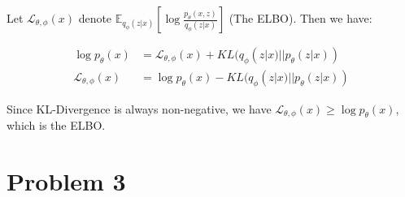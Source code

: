 \documentclass{article}
\begin{document}
\color{blue}

Let $\mathcal{L}_{\theta, \phi}(x)$ denote $\mathbb{E}_{q_\phi(z|x)}\left[\log\frac{p_\theta(x,z)}{q_\phi(z|x)}\right]$ (The ELBO). Then we have:

\begin{align}
    \log p_\theta(x) &= \mathcal{L}_{\theta, \phi}(x) + KL(q_\phi(z|x)||p_\theta(z|x))\\
    \mathcal{L}_{\theta, \phi}(x) &= \log p_\theta(x) - KL(q_\phi(z|x)||p_\theta(z|x))
\end{align}

Since KL-Divergence is always non-negative, we have $\mathcal{L}_{\theta, \phi}(x) \geq \log p_\theta(x)$, which is the ELBO.

\color{black}

\section*{Problem 3}
\end{document}
